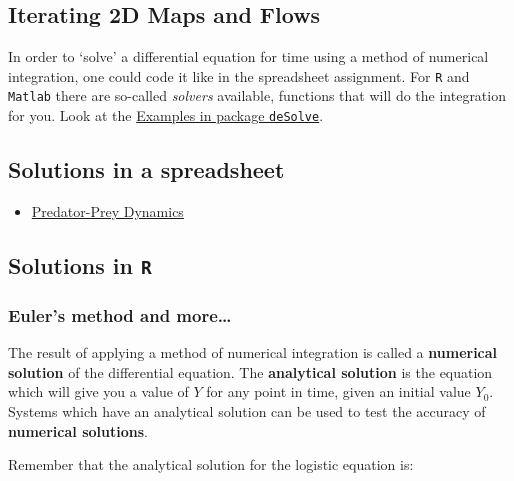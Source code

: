 \documentclass[]{book}
\providecommand{\tightlist}{%
  \setlength{\itemsep}{0pt}\setlength{\parskip}{0pt}}
\begin{document}
\subsection*{Iterating 2D Maps and
Flows}\label{iterating-2d-maps-and-flows-1}

In order to `solve' a differential equation for time using a method of
numerical integration, one could code it like in the spreadsheet
assignment. For \texttt{R} and \texttt{Matlab} there are so-called
\emph{solvers} available, functions that will do the integration for
you. Look at the
\href{http://www.inside-r.org/packages/cran/deSolve/docs/euler}{Examples
in package \texttt{deSolve}}.

\subsection*{Solutions in a
spreadsheet}\label{solutions-in-a-spreadsheet-2}

\begin{itemize}
\tightlist
\item
  \href{https://docs.google.com/spreadsheets/d/1rZDEo8XYNCzhRWrWOli7DDB6f4m87p-hjYv2_KlBLa4/edit?usp=sharing}{Predator-Prey
  Dynamics}
\end{itemize}

\subsection{\texorpdfstring{Solutions in
\texttt{R}}{Solutions in R}}\label{solutions-in-r-2}

\subsubsection*{Euler's method and
more\ldots{}}\label{eulers-method-and-more-1}

The result of applying a method of numerical integration is called a
\textbf{numerical solution} of the differential equation. The
\textbf{analytical solution} is the equation which will give you a value
of \(Y\) for any point in time, given an initial value \(Y_0\). Systems
which have an analytical solution can be used to test the accuracy of
\textbf{numerical solutions}.

Remember that the analytical solution for the logistic equation is:
\end{document}
